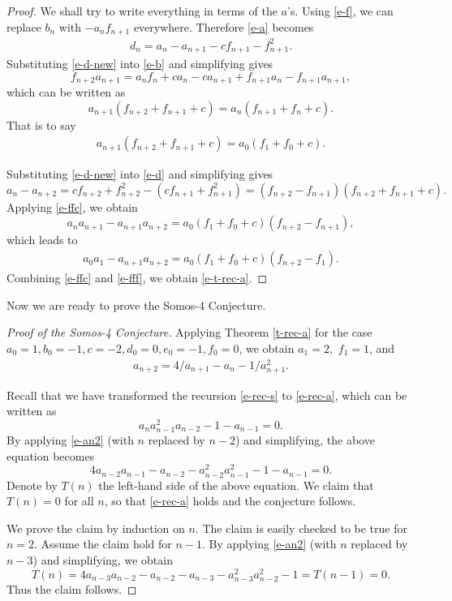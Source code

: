 \documentclass{fpsac}
\begin{document}
\begin{proof}
We shall try to write everything in terms of the $a$'s. Using
\eqref{e-f}, we can replace $b_n$ with $-a_n f_{n+1}$ everywhere.
Therefore \eqref{e-a} becomes
\begin{align}
\label{e-d-new} d_n=a_n-a_{n+1}-cf_{n+1}-f_{n+1}^2.
\end{align}
Substituting \eqref{e-d-new} into \eqref{e-b} and simplifying gives
$$f_{n+2}a_{n+1}=a_nf_n+ca_n-ca_{n+1}+f_{n+1}a_n-f_{n+1}a_{n+1}, $$
which can be written as
$$a_{n+1}(f_{n+2}+f_{n+1}+c)=a_n(f_{n+1}+f_n+c). $$
That is to say
\begin{align}
\label{e-ffc} a_{n+1}(f_{n+2}+f_{n+1}+c)=a_0(f_1+f_0+c).
\end{align}

Substituting \eqref{e-d-new} into \eqref{e-d} and simplifying gives
$$a_n-a_{n+2}=cf_{n+2}+f_{n+2}^2 -(cf_{n+1}+f_{n+1}^2)=(f_{n+2}-f_{n+1})(f_{n+2}+f_{n+1}+c).$$
Applying \eqref{e-ffc}, we obtain
$$
a_na_{n+1}-a_{n+1}a_{n+2} =a_0(f_1+f_0+c) (f_{n+2}-f_{n+1}),
$$
which leads to
\begin{align}\label{e-fff}
a_0a_{1}-a_{n+1}a_{n+2} =a_0(f_1+f_0+c) (f_{n+2}-f_{1}).
\end{align}
Combining \eqref{e-ffc} and \eqref{e-fff}, we obtain
\eqref{e-t-rec-a}.
\end{proof}

Now we are ready to prove the Somos-4 Conjecture.
\begin{proof}[Proof of the Somos-4 Conjecture]
Applying Theorem \ref{t-rec-a} for the case
$a_0=1,b_0=-1,c=-2,d_0=0,e_0=-1,f_0=0$, we obtain $a_1=2,$ $ f_1=1$,
and
\begin{align}\label{e-an2}
a_{n+2}=4/a_{n+1}-a_n-1/a_{n+1}^2.
\end{align}

Recall that we have transformed the recursion \eqref{e-rec-s} to
\eqref{e-rec-a}, which can be written as
$$a_na_{n-1}^2a_{n-2}-1-a_{n-1}=0. $$
By applying \eqref{e-an2} (with $n$ replaced by $n-2$) and
simplifying, the above equation becomes
$$4a_{n-2}a_{n-1}-a_{n-2}-a_{n-2}^2a_{n-1}^2-1-a_{n-1}=0. $$
Denote by $T(n)$ the left-hand side of the above equation. We claim
that $T(n)=0$ for all $n$, so that \eqref{e-rec-a} holds and the
conjecture follows.

We prove the claim by induction on $n$. The claim is easily checked
to be true for $n=2$. Assume the claim hold for $n-1$. By applying
\eqref{e-an2} (with $n$ replaced by $n-3$) and simplifying, we
obtain
$$T(n)=4a_{n-3}a_{n-2}-a_{n-2}-a_{n-3}-a_{n-3}^2a_{n-2}^2-1=T(n-1)=0. $$
Thus the claim follows.
\end{proof}
\end{document}
